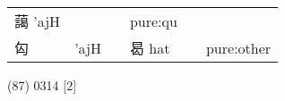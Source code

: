 \documentclass[14pt,a4paper]{scrartcl}
\begin{document}
\begin{longtable}[c]{@{}llllll@{}}
\begin{minipage}[t]{0.14\columnwidth}
藹 'ajH
\strut\end{minipage} &
\begin{minipage}[t]{0.14\columnwidth}\raggedright\strut
\strut\end{minipage} &
\begin{minipage}[t]{0.14\columnwidth}\raggedright\strut
\strut\end{minipage} &
\begin{minipage}[t]{0.14\columnwidth}\raggedright\strut
pure:qu
\strut\end{minipage}\tabularnewline
\begin{minipage}[t]{0.14\columnwidth}\raggedright\strut
匃
\strut\end{minipage} &
\begin{minipage}[t]{0.14\columnwidth}\raggedright\strut
'ajH
\strut\end{minipage} &
\begin{minipage}[t]{0.14\columnwidth}\raggedright\strut
\strut\end{minipage} &
\begin{minipage}[t]{0.14\columnwidth}\raggedright\strut
曷 hat
\strut\end{minipage} &
\begin{minipage}[t]{0.14\columnwidth}\raggedright\strut
\strut\end{minipage} &
\begin{minipage}[t]{0.14\columnwidth}\raggedright\strut
pure:other
\strut\end{minipage}\tabularnewline
\bottomrule
\end{longtable}

(87) 0314 {[}2{]}
\end{document}
